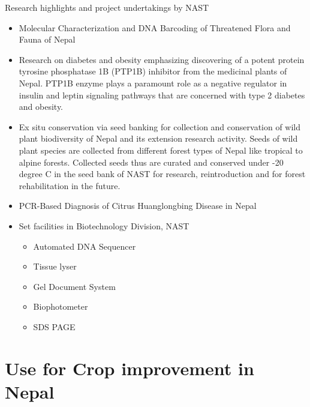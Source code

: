 \documentclass[
  ignorenonframetext,
  aspectratio=169]{beamer}
\providecommand{\tightlist}{%
  \setlength{\itemsep}{0pt}\setlength{\parskip}{0pt}}
\begin{document}
\begin{frame}{Research highlights and project undertakings by NAST}
\protect\hypertarget{research-highlights-and-project-undertakings-by-nast}{}
\footnotesize

\begin{itemize}
\item
  Molecular Characterization and DNA Barcoding of Threatened Flora and
  Fauna of Nepal
\item
  Research on diabetes and obesity emphasizing discovering of a potent
  protein tyrosine phosphatase 1B (PTP1B) inhibitor from the medicinal
  plants of Nepal. PTP1B enzyme plays a paramount role as a negative
  regulator in insulin and leptin signaling pathways that are concerned
  with type 2 diabetes and obesity.
\item
  Ex situ conservation via seed banking for collection and conservation
  of wild plant biodiversity of Nepal and its extension research
  activity. Seeds of wild plant species are collected from different
  forest types of Nepal like tropical to alpine forests. Collected seeds
  thus are curated and conserved under -20 degree C in the seed bank of
  NAST for research, reintroduction and for forest rehabilitation in the
  future.
\item
  PCR-Based Diagnosis of Citrus Huanglongbing Disease in Nepal
\item
  Set facilities in Biotechnology Division, NAST

  \begin{itemize}
  \tightlist
  \item
    Automated DNA Sequencer
  \item
    Tissue lyser
  \item
    Gel Document System
  \item
    Biophotometer
  \item
    SDS PAGE
  \end{itemize}
\end{itemize}
\end{frame}

\hypertarget{use-for-crop-improvement-in-nepal}{%
\section{Use for Crop improvement in
Nepal}\label{use-for-crop-improvement-in-nepal}}
\end{document}
